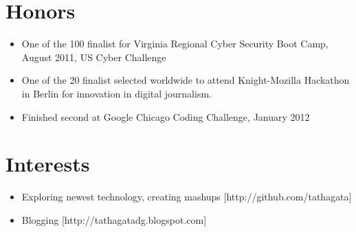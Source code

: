 \documentclass[a4paper, oneside, final]{scrartcl}
\begin{document}
\begin{center}

\section{Honors}
\begin{itemize}
\small\sffamily{}
\item One of the 100 finalist for Virginia Regional Cyber Security Boot Camp, August 2011, US Cyber Challenge
\vspace{-0.3cm}
\item One of the 20 finalist selected worldwide to attend Knight-Mozilla Hackathon in Berlin for innovation in digital journalism.
\vspace{-0.3cm}
\item Finished second at Google Chicago Coding Challenge, January 2012
\end{itemize} 

\section{Interests}
\begin{itemize}
\small\sffamily{}
\item Exploring newest technology, creating mashups [http://github.com/tathagata]
\vspace{-0.3cm}
\item Blogging [http://tathagatadg.blogspot.com]
\end{itemize} 


\end{center}
\end{document}
